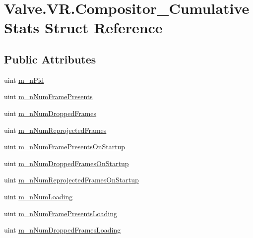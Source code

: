 \hypertarget{struct_valve_1_1_v_r_1_1_compositor___cumulative_stats}{}\section{Valve.\+V\+R.\+Compositor\+\_\+\+Cumulative\+Stats Struct Reference}
\label{struct_valve_1_1_v_r_1_1_compositor___cumulative_stats}
\subsection*{Public Attributes}
\begin{DoxyCompactItemize}
\item 
uint \mbox{\hyperlink{struct_valve_1_1_v_r_1_1_compositor___cumulative_stats_a366f703d1665826e7b2431a112c993a3}{m\+\_\+n\+Pid}}
\item 
uint \mbox{\hyperlink{struct_valve_1_1_v_r_1_1_compositor___cumulative_stats_a4f4e0d234f13e338ccf016514e5d2699}{m\+\_\+n\+Num\+Frame\+Presents}}
\item 
uint \mbox{\hyperlink{struct_valve_1_1_v_r_1_1_compositor___cumulative_stats_a590238b050ef035ac7fa8db3711df938}{m\+\_\+n\+Num\+Dropped\+Frames}}
\item 
uint \mbox{\hyperlink{struct_valve_1_1_v_r_1_1_compositor___cumulative_stats_a30f940573e0ac90a7559a171bddc78b0}{m\+\_\+n\+Num\+Reprojected\+Frames}}
\item 
uint \mbox{\hyperlink{struct_valve_1_1_v_r_1_1_compositor___cumulative_stats_a23d201d9d0231c6370822315e7a56a67}{m\+\_\+n\+Num\+Frame\+Presents\+On\+Startup}}
\item 
uint \mbox{\hyperlink{struct_valve_1_1_v_r_1_1_compositor___cumulative_stats_a844e93ed948eba912dec5d5f12763f5b}{m\+\_\+n\+Num\+Dropped\+Frames\+On\+Startup}}
\item 
uint \mbox{\hyperlink{struct_valve_1_1_v_r_1_1_compositor___cumulative_stats_a39b3dda5f734becfbdf92f8c2754d231}{m\+\_\+n\+Num\+Reprojected\+Frames\+On\+Startup}}
\item 
uint \mbox{\hyperlink{struct_valve_1_1_v_r_1_1_compositor___cumulative_stats_ae90229f32cee913339ffc462199ee27f}{m\+\_\+n\+Num\+Loading}}
\item 
uint \mbox{\hyperlink{struct_valve_1_1_v_r_1_1_compositor___cumulative_stats_a6da32c9f0f0318b5b607a894c744998c}{m\+\_\+n\+Num\+Frame\+Presents\+Loading}}
\item 
uint \mbox{\hyperlink{struct_valve_1_1_v_r_1_1_compositor___cumulative_stats_a53990deaa6ef0e23e74e7bc16279055a}{m\+\_\+n\+Num\+Dropped\+Frames\+Loading}}

\end{DoxyCompactItemize}
